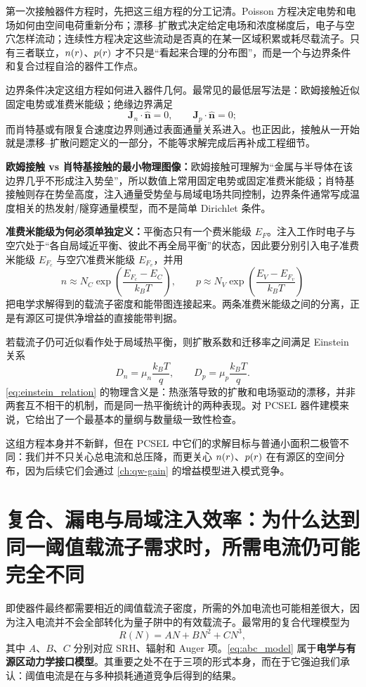 第一次接触器件方程时，先把这三组方程的分工记清。Poisson 方程决定电势和电场如何由空间电荷重新分布；漂移--扩散式决定给定电场和浓度梯度后，电子与空穴怎样流动；连续性方程决定这些流动是否真的在某一区域积累或耗尽载流子。只有三者联立，$n(r)$、$p(r)$ 才不只是“看起来合理的分布图”，而是一个与边界条件和复合过程自洽的器件工作点。

边界条件决定这组方程如何进入器件几何。最常见的最低层写法是：欧姆接触近似固定电势或准费米能级；绝缘边界满足
\[
\bm J_n\cdot\hat{\bm n}=0,\qquad \bm J_p\cdot\hat{\bm n}=0;
\]
而肖特基或有限复合速度边界则通过表面通量关系进入。也正因此，接触从一开始就是漂移--扩散问题定义的一部分，不能等求解完成后再补成工程细节。

\textbf{欧姆接触 vs 肖特基接触的最小物理图像：}欧姆接触可理解为“金属与半导体在该边界几乎不形成注入势垒”，所以数值上常用固定电势或固定准费米能级；肖特基接触则存在势垒高度，注入通量受势垒与局域电场共同控制，边界条件通常写成温度相关的热发射/隧穿通量模型，而不是简单 Dirichlet 条件。

\begin{IntuitionBox}
\textbf{准费米能级为何必须单独定义：}平衡态只有一个费米能级 $E_F$。注入工作时电子与空穴处于“各自局域近平衡、彼此不再全局平衡”的状态，因此要分别引入电子准费米能级 $E_{F_c}$ 与空穴准费米能级 $E_{F_v}$，并用
\[
n \approx N_C\exp\!\left(\frac{E_{F_c}-E_C}{k_BT}\right),\qquad
p \approx N_V\exp\!\left(\frac{E_V-E_{F_v}}{k_BT}\right)
\]
把电学求解得到的载流子密度和能带图连接起来。两条准费米能级之间的分离，正是有源区可提供净增益的直接能带判据。
\end{IntuitionBox}

若载流子仍可近似看作处于局域热平衡，则扩散系数和迁移率之间满足 Einstein 关系
\begin{equation}
D_n = \mu_n\frac{k_BT}{q},
\qquad
D_p = \mu_p\frac{k_BT}{q}.
\label{eq:einstein_relation}
\end{equation}
\cref{eq:einstein_relation} 的物理含义是：热涨落导致的扩散和电场驱动的漂移，并非两套互不相干的机制，而是同一热平衡统计的两种表现。对 PCSEL 器件建模来说，它给出了一个最基本的量纲与数量级一致性检查。

这组方程本身并不新鲜，但在 PCSEL 中它们的求解目标与普通小面积二极管不同：我们并不只关心总电流和总压降，而更关心 $n(r)$、$p(r)$ 在有源区的空间分布，因为后续它们会通过 \cref{ch:qw-gain} 的增益模型进入模式竞争。

\section[复合、漏电与局域注入效率]{复合、漏电与局域注入效率：为什么达到同一阈值载流子需求时，所需电流仍可能完全不同}
即使器件最终都需要相近的阈值载流子密度，所需的外加电流也可能相差很大，因为注入电流并不会全部转化为量子阱中的有效载流子。最常用的复合代理模型为
\begin{equation}
R(N)=AN+BN^2+CN^3,
\label{eq:abc_model}
\end{equation}
其中 $A$、$B$、$C$ 分别对应 SRH、辐射和 Auger 项。\cref{eq:abc_model} 属于\textbf{电学与有源区动力学接口模型}。其重要之处不在于三项的形式本身，而在于它强迫我们承认：阈值电流是在与多种损耗通道竞争后得到的结果。

